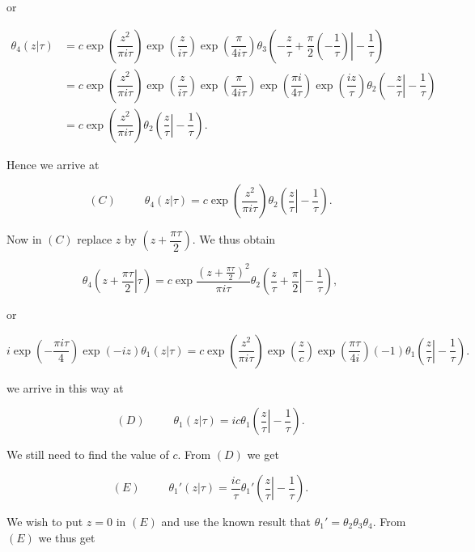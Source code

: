 \begin{solution}
or

$$\begin{array}{ll}
\theta_4(z | \tau) &= c \exp \left( \dfrac{z^2}{\pi i \tau} \right) \exp \left( \dfrac{z}{i \tau} \right) \exp \left( \dfrac{\pi}{4 i \tau} \right) \theta_3 \left( \left. -\dfrac{z}{\tau} + \dfrac{\pi}{2}\left( - \dfrac{1}{\tau} \right) \right| - \dfrac{1}{\tau} \right) \\
&= c \exp \left( \dfrac{z^2}{\pi i \tau} \right) \exp \left( \dfrac{z}{i \tau} \right) \exp \left( \dfrac{\pi}{4 i \tau} \right) \exp \left( \dfrac{\pi i }{4 \tau} \right) \exp \left( \dfrac{iz}{\tau} \right) \theta_2 \left( \left. -\dfrac{z}{\tau} \right| -\dfrac{1}{\tau} \right) \\
&= c \exp \left( \dfrac{z^2}{\pi i \tau} \right) \theta_2 \left( \left. \dfrac{z}{\tau} \right| -\dfrac{1}{\tau} \right).
\end{array}$$

Hence we arrive at

$$(C) \hspace{30pt} \theta_4(z | \tau) = c \exp \left( \dfrac{z^2}{\pi i \tau} \right) \theta_2 \left( \left. \dfrac{z}{\tau} \right| - \dfrac{1}{\tau} \right).$$

Now in $(C)$ replace $z$ by $\left( z + \dfrac{\pi \tau}{2} \right).$ We thus obtain

$$\theta_4 \left( \left. z + \dfrac{\pi \tau}{2} \right| \tau \right) = c \exp \dfrac{(z+\frac{\pi \tau}{2} )^2}{\pi i \tau } \theta_2 \left( \left. \dfrac{z}{\tau} + \dfrac{\pi}{2} \right| - \dfrac{1}{\tau} \right),$$

or

$$i \exp \left( - \dfrac{\pi i \tau}{4} \right) \exp (-iz) \theta_1(z|\tau) = c \exp \left( \dfrac{z^2}{\pi i \tau} \right) \exp \left( \dfrac{z}{c} \right) \exp \left( \dfrac{\pi \tau}{4 i} \right) (-1) \theta_1 \left( \left. \dfrac{z}{\tau} \right| - \dfrac{1}{\tau} \right).$$

we arrive in this way at

$$(D) \hspace{30pt} \theta_1(z | \tau) = ic \theta_1 \left( \left. \dfrac{z}{\tau} \right| - \dfrac{1}{\tau} \right).$$

We still need to find the value of $c$. From $(D)$ we get

$$(E) \hspace{30pt} \theta_1'(z| \tau) = \dfrac{ic}{\tau} \theta_1' \left( \left. \dfrac{z}{\tau} \right| - \dfrac{1}{\tau} \right).$$

We wish to put $z=0$ in $(E)$ and use the known result that $\theta_1'=\theta_2\theta_3\theta_4$. From $(E)$ we thus get


\end{solution}
